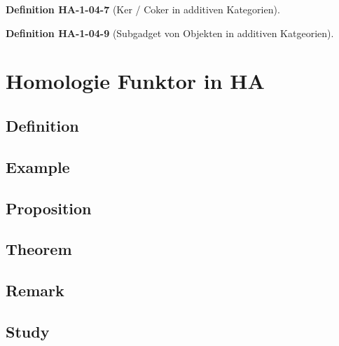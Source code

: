 \documentclass[10pt, letterpaper]{article}
\newcommand{\CustomHeading}[3]{%
  \par\medskip\noindent%
  \textbf{#1 #2} \textnormal{(#3)}.\enskip%
}
\newenvironment{DEF}[2]{\CustomHeading{Definition}{#1}{#2}}{}
\begin{document}
\begin{DEF}{HA-1-04-7}{Ker / Coker in additiven Kategorien}

\end{DEF}

\begin{DEF}{HA-1-04-9}{Subgadget von Objekten in additiven Katgeorien}

\end{DEF}
































\section{Homologie Funktor in HA}

\subsection{Definition}

\subsection{Example}

\subsection{Proposition}

\subsection{Theorem}

\subsection{Remark}

\subsection{Study}
\end{document}
